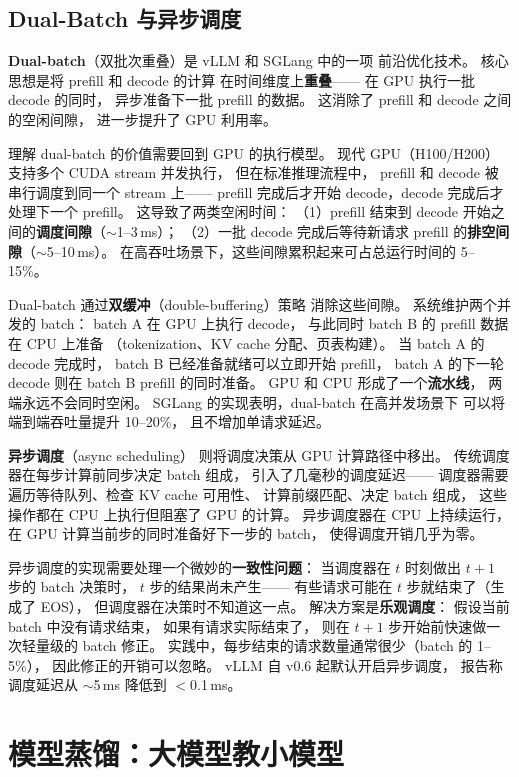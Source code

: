 \subsection{Dual-Batch 与异步调度}

\textbf{Dual-batch}（双批次重叠）是 vLLM 和 SGLang 中的一项
前沿优化技术。
核心思想是将 prefill 和 decode 的计算
在时间维度上\textbf{重叠}——
在 GPU 执行一批 decode 的同时，
异步准备下一批 prefill 的数据。
这消除了 prefill 和 decode 之间的空闲间隙，
进一步提升了 GPU 利用率。

理解 dual-batch 的价值需要回到 GPU 的执行模型。
现代 GPU（H100/H200）支持多个 CUDA stream 并发执行，
但在标准推理流程中，
prefill 和 decode 被串行调度到同一个 stream 上——
prefill 完成后才开始 decode，decode 完成后才处理下一个 prefill。
这导致了两类空闲时间：
（1）prefill 结束到 decode 开始之间的\textbf{调度间隙}（$\sim$1--3\,ms）；
（2）一批 decode 完成后等待新请求 prefill 的\textbf{排空间隙}（$\sim$5--10\,ms）。
在高吞吐场景下，这些间隙累积起来可占总运行时间的 5--15\%。

Dual-batch 通过\textbf{双缓冲}（double-buffering）策略
消除这些间隙。
系统维护两个并发的 batch：
batch A 在 GPU 上执行 decode，
与此同时 batch B 的 prefill 数据在 CPU 上准备
（tokenization、KV cache 分配、页表构建）。
当 batch A 的 decode 完成时，
batch B 已经准备就绪可以立即开始 prefill，
batch A 的下一轮 decode 则在 batch B prefill 的同时准备。
GPU 和 CPU 形成了一个\textbf{流水线}，
两端永远不会同时空闲。
SGLang 的实现表明，dual-batch 在高并发场景下
可以将端到端吞吐量提升 10--20\%，
且不增加单请求延迟。

\textbf{异步调度}（async scheduling）
则将调度决策从 GPU 计算路径中移出。
传统调度器在每步计算前同步决定 batch 组成，
引入了几毫秒的调度延迟——
调度器需要遍历等待队列、检查 KV cache 可用性、
计算前缀匹配、决定 batch 组成，
这些操作都在 CPU 上执行但阻塞了 GPU 的计算。
异步调度器在 CPU 上持续运行，
在 GPU 计算当前步的同时准备好下一步的 batch，
使得调度开销几乎为零。

异步调度的实现需要处理一个微妙的\textbf{一致性问题}：
当调度器在 $t$ 时刻做出 $t+1$ 步的 batch 决策时，
$t$ 步的结果尚未产生——
有些请求可能在 $t$ 步就结束了（生成了 EOS），
但调度器在决策时不知道这一点。
解决方案是\textbf{乐观调度}：
假设当前 batch 中没有请求结束，
如果有请求实际结束了，
则在 $t+1$ 步开始前快速做一次轻量级的 batch 修正。
实践中，每步结束的请求数量通常很少（batch 的 1--5\%），
因此修正的开销可以忽略。
vLLM 自 v0.6 起默认开启异步调度，
报告称调度延迟从 $\sim$5\,ms 降低到 $<$0.1\,ms。


\section{模型蒸馏：大模型教小模型}

